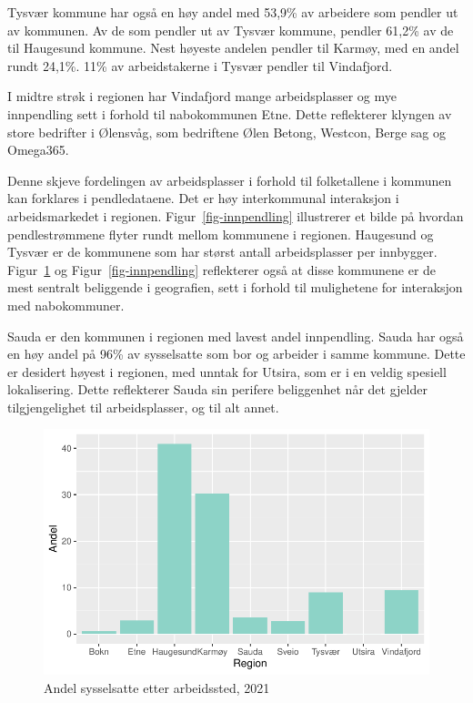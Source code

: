 \documentclass[
]{article}
\begin{document}
Tysvær kommune har også en høy andel med 53,9\% av arbeidere som pendler
ut av kommunen. Av de som pendler ut av Tysvær kommune, pendler 61,2\%
av de til Haugesund kommune. Nest høyeste andelen pendler til Karmøy,
med en andel rundt 24,1\%. 11\% av arbeidstakerne i Tysvær pendler til
Vindafjord.

I midtre strøk i regionen har Vindafjord mange arbeidsplasser og mye
innpendling sett i forhold til nabokommunen Etne. Dette reflekterer
klyngen av store bedrifter i Ølensvåg, som bedriftene Ølen Betong,
Westcon, Berge sag og Omega365.

Denne skjeve fordelingen av arbeidsplasser i forhold til folketallene i
kommunen kan forklares i pendledataene. Det er høy interkommunal
interaksjon i arbeidsmarkedet i regionen. Figur~\ref{fig-innpendling}
illustrerer et bilde på hvordan pendlestrømmene flyter rundt mellom
kommunene i regionen. Haugesund og Tysvær er de kommunene som har størst
antall arbeidsplasser per innbygger.
Figur~\ref{fig-sysselsettingsfordeling} og Figur~\ref{fig-innpendling}
reflekterer også at disse kommunene er de mest sentralt beliggende i
geografien, sett i forhold til mulighetene for interaksjon med
nabokommuner.

Sauda er den kommunen i regionen med lavest andel innpendling. Sauda har
også en høy andel på 96\% av sysselsatte som bor og arbeider i samme
kommune. Dette er desidert høyest i regionen, med unntak for Utsira, som
er i en veldig spesiell lokalisering. Dette reflekterer Sauda sin
perifere beliggenhet når det gjelder tilgjengelighet til arbeidsplasser,
og til alt annet.

\begin{figure}[H]

{\centering \includegraphics{Masteroppgave_files/figure-pdf/fig-sysselsettingsfordeling-1.pdf}

}

\caption{\label{fig-sysselsettingsfordeling}Andel sysselsatte etter
arbeidssted, 2021}

\end{figure}
\end{document}
